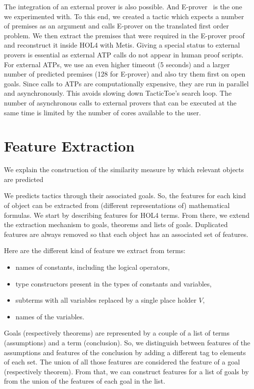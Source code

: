 \documentclass[runningheads,a4paper,draft]{svjour3}
\def\holfour{\textsf{HOL4}\xspace}
\def\eprover{\textsf{E-prover}\xspace}
\def\metis{\textsf{Metis}\xspace}
\def\tactictoe{\textsf{TacticToe}\xspace}
\begin{document}
The integration of an external prover is also possible. And
\eprover~\cite{eprover} is the one we experimented with.
To this end, we created a tactic which expects a number of premises as an 
argument
and calls \eprover on the translated first order problem. We then extract the
premises that were required in the \eprover
proof and reconstruct it inside \holfour with \metis. Giving a special status
to external
provers is essential as external ATP calls do not appear in human
proof scripts. For external ATPs, we use an even higher timeout (5 seconds) and 
a larger number of predicted premises (128 for \eprover) and also try them 
first on open 
goals. Since calls to ATPs are
computationally expensive, they are run in parallel and asynchronously. This
avoids slowing down \tactictoe's search loop. The number of asynchronous calls
to external provers that can be executed at the same time is limited by the
number of cores available to the user.





\section{Feature Extraction}\label{sec:features}
We explain the construction of the similarity measure by which relevant
objects are predicted

We predicts tactics through their associated goals. So, the features 
for each kind of object can be extracted from (different representations of)
mathematical formulas. We start by describing features for \holfour terms. From 
there, we extend the extraction mechanism
to goals, theorems and lists of goals. Duplicated features are always removed
so that each object has an associated set of features.

Here are the different kind of feature we extract from terms:
\begin{itemize}
\item names of constants, including the logical operators,
\item type constructors present in the types of constants and variables,
\item subterms with all variables replaced by a single place holder $V$,
\item names of the variables.
\end{itemize} 
Goals (respectively theorems) are represented by a couple of a list of 
terms (assumptions) and a term (conclusion). So, we distinguish between
features of the assumptions and features of the conclusion by adding a
different tag to elements of each set. The union of all those 
features are considered the feature of a goal (respectively theorem). From 
that, we can construct features for a list of goals by
from the union of the features of each goal in the list.
\end{document}
